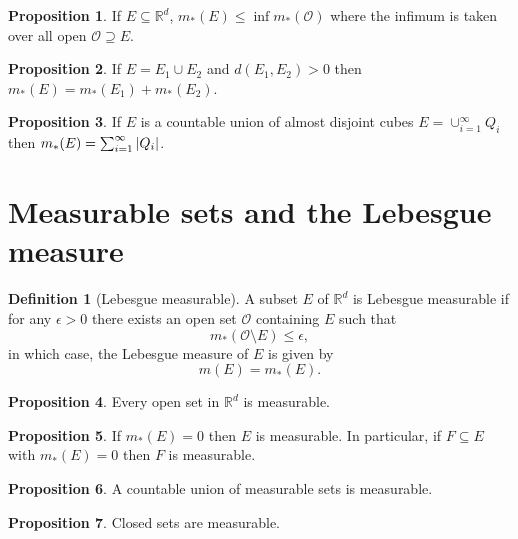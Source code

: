 \documentclass{article}
\theoremstyle{definition}
\newtheorem{prop}{Proposition}[section]
\newcommand{\R}{\mathbb{R}}
\theoremstyle{theorem}
\newtheorem{definition}[theorem]{Definition}
\begin{document}
\begin{prop}
If $E \subseteq \mathbb{R}^d$, $m_*(E) \leq \inf m_*(\mathcal{O})$ where the infimum is taken over all open $\mathcal{O} \supseteq E$. 
\end{prop}

\begin{prop}
If $E = E_1 \cup E_2$ and $d(E_1, E_2) > 0$ then $m_*(E) = m_*(E_1) + m_*(E_2)$.
\end{prop}

\begin{prop}
If $E$ is a countable union of almost disjoint cubes $E = \cup^\infty_{i=1}Q_i$ then $m_*(E) = \sum^\infty_{i=1}\abs{Q_i}$.
\end{prop}






\section{Measurable sets and the Lebesgue measure}

\begin{definition}[Lebesgue measurable]
    A subset $E$ of $\R^d$ is Lebesgue measurable if for any $\epsilon > 0$ there exists an open set $\mathcal{O}$ containing $E$ such that 
    \begin{equation*}
        m_*(\mathcal{O}\setminus E) \leq \epsilon,
    \end{equation*}
    in which case, the Lebesgue measure of $E$ is given by
    \begin{equation*}
        m(E) = m_*(E).
    \end{equation*}
\end{definition}


\begin{prop}
Every open set in $\R^d$ is measurable. 
\end{prop}

\begin{prop}
If $m_*(E) = 0$ then $E$ is measurable. In particular, if $F\subseteq E$ with $m_*(E)=  0$ then $F$ is measurable. 
\end{prop}

\begin{prop}
A countable union of measurable sets is measurable. 
\end{prop}

\begin{prop}
Closed sets are measurable. 
\end{prop}
\end{document}
